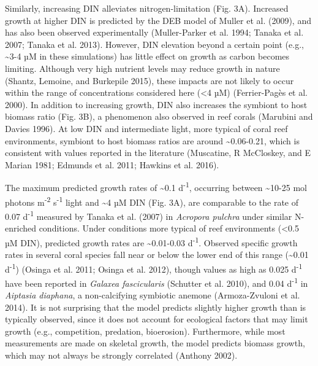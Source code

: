 \documentclass[]{elsarticle} %
\begin{document}
Similarly, increasing DIN alleviates nitrogen-limitation (Fig. 3A).
Increased growth at higher DIN is predicted by the DEB model of Muller
et al. (2009), and has also been observed experimentally (Muller-Parker
et al. 1994; Tanaka et al. 2007; Tanaka et al. 2013). However, DIN
elevation beyond a certain point (e.g., \textasciitilde{}3-4 µM in these
simulations) has little effect on growth as carbon becomes limiting.
Although very high nutrient levels may reduce growth in nature (Shantz,
Lemoine, and Burkepile 2015), these impacts are not likely to occur
within the range of concentrations considered here (\textless{}4 µM)
(Ferrier-Pagès et al. 2000). In addition to increasing growth, DIN also
increases the symbiont to host biomass ratio (Fig. 3B), a phenomenon
also observed in reef corals (Marubini and Davies 1996). At low DIN and
intermediate light, more typical of coral reef environments, symbiont to
host biomass ratios are around \textasciitilde{}0.06-0.21, which is
consistent with values reported in the literature (Muscatine, R
McCloskey, and E Marian 1981; Edmunds et al. 2011; Hawkins et al. 2016).

The maximum predicted growth rates of \textasciitilde{}0.1
d\textsuperscript{-1}, occurring between \textasciitilde{}10-25 mol
photons m\textsuperscript{-2} s\textsuperscript{-1} light and
\textasciitilde{}4 µM DIN (Fig. 3A), are comparable to the rate of 0.07
d\textsuperscript{-1} measured by Tanaka et al. (2007) in \emph{Acropora
pulchra} under similar N-enriched conditions. Under conditions more
typical of reef environments (\textless{}0.5 µM DIN), predicted growth
rates are \textasciitilde{}0.01-0.03 d\textsuperscript{-1}. Observed
specific growth rates in several coral species fall near or below the
lower end of this range (\textasciitilde{}0.01 d\textsuperscript{-1})
(Osinga et al. 2011; Osinga et al. 2012), though values as high as 0.025
d\textsuperscript{-1} have been reported in \emph{Galaxea fascicularis}
(Schutter et al. 2010), and 0.04 d\textsuperscript{-1} in \emph{Aiptasia
diaphana}, a non-calcifying symbiotic anemone (Armoza-Zvuloni et al.
2014). It is not surprising that the model predicts slightly higher
growth than is typically observed, since it does not account for
ecological factors that may limit growth (e.g., competition, predation,
bioerosion). Furthermore, while most measurements are made on skeletal
growth, the model predicts biomass growth, which may not always be
strongly correlated (Anthony 2002).
\end{document}
